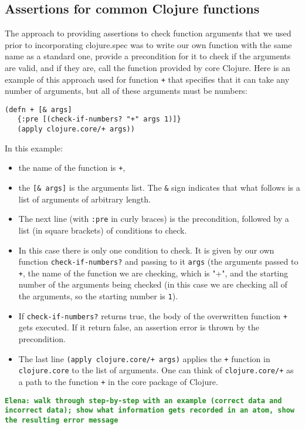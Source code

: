 \documentclass[12pt]{article}
\newcommand{\comment}[1]{{\bf \tt  {#1}}}
\newcommand{\emcomment}[1]{\textcolor{ForestGreen}{\comment{Elena: {#1}}}}
\begin{document}
\subsection{Assertions for common Clojure functions}
The approach to providing assertions to check function arguments that we used prior to 
incorporating clojure.spec was to write our own function with the same name as a standard one, 
provide a precondition for it to check if the arguments are valid, and if they are, call 
the function provided by core Clojure. Here is an example of this approach used for
function {\tt +} that specifies that it can take any number of arguments, but all
of these arguments must be numbers:
\begin{verbatim}
(defn + [& args]
   {:pre [(check-if-numbers? "+" args 1)]}
   (apply clojure.core/+ args))
\end{verbatim} 
In this example:
\begin{itemize}
\item the name of the function is {\tt +}, 
\item the {\tt [\& args]} is the arguments list. The {\tt \&} sign indicates that what follows is
a list of arguments of arbitrary length. 
\item The next line (with {\tt :pre} in curly braces) is the precondition, followed by a list
(in square brackets) of conditions to check. 
\item In this case there is only one condition to check. It is given by our own 
function {\tt check-if-numbers?} 
and passing to it {\tt args} (the arguments passed to {\tt +}, the name of the function we 
are checking, which is "+", and the starting number of the arguments being checked 
(in this case we are checking all of the arguments, so the starting number is {\tt 1}). 
\item  If {\tt check-if-numbers?}  returns true, the body of the overwritten function {\tt +} 
gets executed. If it return false, an assertion error is thrown by the precondition. 
\item The last line {\tt  (apply clojure.core/+ args)} applies the {\tt +} function in 
{\tt clojure.core} to the list of arguments. One can think of {\tt  clojure.core/+} as 
a path to the function {\tt +} in the core package of Clojure. 
\end{itemize}

\emcomment{walk through step-by-step with an example (correct data and incorrect data); 
show what information gets recorded in an atom, show the resulting error message}
\end{document}
